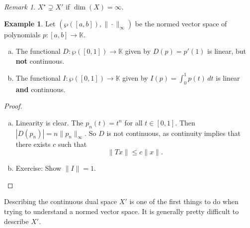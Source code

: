 \documentclass[10pt, oneside, reqno]{amsart}
\theoremstyle{plain}%
\theoremstyle{definition}
\newtheorem{exmp}[thm]{Example}
\theoremstyle{remark}
\newtheorem*{rem}{Remark}
\newcommand{\K}{\mathbb{K}}
\begin{document}
\begin{rem}
    $X^\star \supsetneq X'$ if $\dim(X) = \infty$.
\end{rem}

\begin{exmp}
    Let $(\wp([a,b]), \| \cdot \|_\infty)$ be the normed vector space of polynomials $p: [a,b] \rightarrow \K$.                 
    \begin{enumerate}[(a)]
        \item The functional $D : \wp([0,1]) \rightarrow \K$ given by $D(p) = p'(1)$ is linear, but \textbf{not} continuous.
        \item The functional $I: \wp([0,1]) \rightarrow \K$ given by $I(p) = \int_0^1 p(t) \, dt$ is linear \textbf{and} continuous.
    \end{enumerate}
\end{exmp}

\begin{proof}
\begin{enumerate}[(a)]
        \item Linearity is clear.  The $p_n(t) = t^n$ for all $t \in [0,1]$.  Then $|D(p_n)| =   n \| p_n \|_\infty$.  So $D$ is not continuous, as continuity implies that there exists $c$ such that \[
            \| Tx \| \leq c \| x \|.
        \]
        \item Exercise: Show $\| I \| = 1$.
\end{enumerate}
\end{proof}

Describing the continuous dual space $X'$ is one of the first things to do when trying to understand a normed vector space.  It is generally pretty difficult to describe $X'$.
\end{document}
